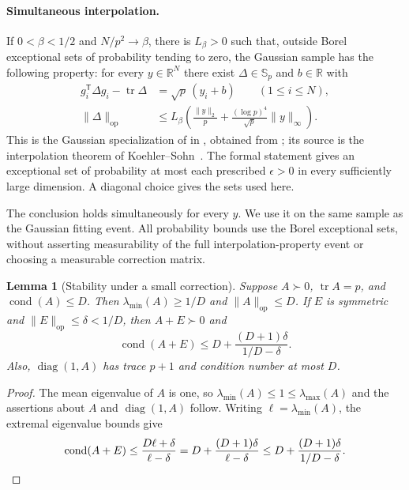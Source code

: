 \documentclass[11pt]{article}
\newcommand{\R}{\mathbb R}
\newcommand{\Sym}{\mathbb S}
\DeclareMathOperator{\tr}{tr}
\DeclareMathOperator{\cond}{cond}
\newcommand{\opnorm}[1]{\lVert#1\rVert_{\mathrm{op}}}
\newcommand{\norm}[1]{\lVert#1\rVert}
\newtheorem{lemma}[theorem]{Lemma}
\theoremstyle{remark}
\begin{document}
\paragraph{Simultaneous interpolation.}
If $0<\beta<1/2$ and $N/p^2\to\beta$, there is $L_\beta>0$ such that,
outside Borel exceptional sets of probability tending to zero, the
Gaussian sample has the following property: for every $y\in\R^N$ there
exist $\Delta\in\Sym_p$ and $b\in\R$ with
\begin{align}
 g_i^{\mathsf T}\Delta g_i-\tr\Delta
       &=\sqrt p\,(y_i+b)\qquad(1\le i\le N),\label{eq:interpolation}\\
 \opnorm{\Delta}
       &\le L_\beta\left(\frac{\norm y_2}{p}
          +\frac{(\log p)^4}{\sqrt p}\norm y_\infty\right).
          \label{eq:interpolation-bound}
\end{align}
This is the Gaussian specialization of
 in
, obtained from
; its source is the interpolation theorem
of Koehler--Sohn~\cite[Theorem 1.9]{KoehlerSohn2026}.
The formal statement gives an exceptional set of probability at most
each prescribed $\epsilon>0$ in every sufficiently large dimension.
A diagonal choice gives the sets used here.

The conclusion holds simultaneously for every $y$. We use it on the
same sample as the Gaussian fitting event. All probability bounds use
the Borel exceptional sets, without asserting measurability of the full
interpolation-property event or choosing a measurable correction matrix.

\begin{lemma}[Stability under a small correction]\label{lem:stability}
Suppose $A\succ0$, $\tr A=p$, and $\cond(A)\le D$. Then
$\lambda_{\min}(A)\ge1/D$ and $\opnorm A\le D$. If $E$ is symmetric
and $\opnorm E\le\delta<1/D$, then $A+E\succ0$ and
\begin{equation}\label{eq:condition-stability}
 \cond(A+E)\le D+\frac{(D+1)\delta}{1/D-\delta}.
\end{equation}
Also, $\operatorname{diag}(1,A)$ has trace $p+1$ and condition number
at most $D$.
\end{lemma}
\begin{proof}
The mean eigenvalue of $A$ is one, so
$\lambda_{\min}(A)\le1\le\lambda_{\max}(A)$ and the assertions about
$A$ and $\operatorname{diag}(1,A)$ follow. Writing
$\ell=\lambda_{\min}(A)$, the extremal eigenvalue bounds give
\[
 \cond(A+E)\le\frac{D\ell+\delta}{\ell-\delta}
   =D+\frac{(D+1)\delta}{\ell-\delta}
   \le D+\frac{(D+1)\delta}{1/D-\delta}.\qedhere
\]
\end{proof}
\end{document}
